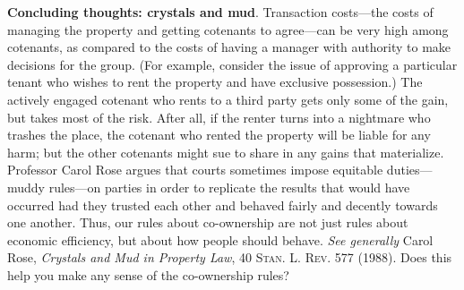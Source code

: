 \item \textbf{Concluding thoughts: crystals and mud}. Transaction
costs---the costs of managing the property and getting cotenants to agree---can
be very high among cotenants, as compared to the costs of having a manager
with authority to make decisions for the group. (For example, consider the
issue of approving a particular tenant who wishes to rent the property and have
exclusive possession.) The actively engaged cotenant who rents to a third
party gets only some of the gain, but takes most of the risk. After all, if
the renter turns into a nightmare who trashes the place, the cotenant who
rented the property will be liable for any harm; but the other cotenants might
sue to share in any gains that materialize. Professor Carol Rose argues that
courts sometimes impose equitable duties---muddy rules---on parties in order
to replicate the results that would have occurred had they trusted each other
and behaved fairly and decently towards one another. Thus, our rules about
co-ownership are not just rules about economic efficiency, but about how people
should behave. \textit{See generally} Carol Rose, \textit{Crystals and Mud in
Property Law}, 40 \textsc{Stan. L. Rev.} 577 (1988). Does this help you make
any sense of the co-ownership rules?

